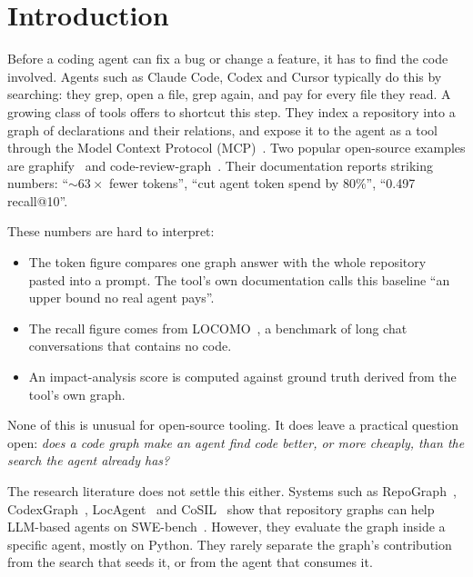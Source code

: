 \documentclass[sigconf,nonacm]{acmart}
\newcommand{\gfy}{graphify\xspace}
\newcommand{\crg}{code-review-graph\xspace}
\begin{document}

\maketitle

\section{Introduction}

Before a coding agent can fix a bug or change a feature, it has to find the code involved. Agents such as Claude Code, Codex and Cursor typically do this by searching: they grep, open a file, grep again, and pay for every file they read. A growing class of tools offers to shortcut this step. They index a repository into a graph of declarations and their relations, and expose it to the agent as a tool through the Model Context Protocol (MCP)~\cite{anthropic2024mcp}. Two popular open-source examples are \gfy~\cite{graphify} and \crg~\cite{crg}. Their documentation reports striking numbers: ``${\sim}63\times$ fewer tokens'', ``cut agent token spend by 80\%'', ``0.497 recall@10''.

These numbers are hard to interpret:
\begin{itemize}
\item The token figure compares one graph answer with the whole repository pasted into a prompt. The tool's own documentation calls this baseline ``an upper bound no real agent pays''.
\item The recall figure comes from LOCOMO~\cite{maharana2024locomo}, a benchmark of long chat conversations that contains no code.
\item An impact-analysis score is computed against ground truth derived from the tool's own graph.
\end{itemize}
None of this is unusual for open-source tooling. It does leave a practical question open: \emph{does a code graph make an agent find code better, or more cheaply, than the search the agent already has?}

The research literature does not settle this either. Systems such as RepoGraph~\cite{ouyang2025repograph}, CodexGraph~\cite{liu2025codexgraph}, LocAgent~\cite{chen2025locagent} and CoSIL~\cite{jiang2025cosil} show that repository graphs can help LLM-based agents on SWE-bench~\cite{jimenez2024swebench}. However, they evaluate the graph inside a specific agent, mostly on Python. They rarely separate the graph's contribution from the search that seeds it, or from the agent that consumes it.
\end{document}
